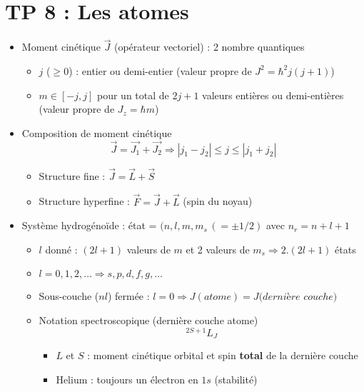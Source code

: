 
\section*{TP 8 : Les atomes}
\begin{itemize}
	\item Moment cinétique $\vec{J}$ (opérateur vectoriel) : 2 nombre quantiques
		\begin{itemize}
			\item $j$ ($\geq 0$) : entier ou demi-entier (valeur propre de $J^2 = \hbar ^2 j(j+1)$)
			\item $m \in [-j,j]$ pour un total de $2j +1$ valeurs entières ou demi-entières (valeur propre de $J_z = \hbar m$)
		\end{itemize}
		
	\item Composition de moment cinétique
	\begin{equation}
		\vec{J} = \vec{J_1}+\vec{J_2} \Rightarrow |j_1-j_2| \leq j \leq |j_1+j_2|
	\end{equation}
	\begin{itemize}
		\item Structure fine : $\vec{J}=\vec{L}+\vec{S}$
		\item Structure hyperfine : $\vec{F} = \vec{J}+\vec{L}$ (spin du noyau)
	\end{itemize}
	
	\item Système hydrogénoïde : état = $(n,l,m,m_s \, (= \pm 1/2)$ avec $n_r = n+l+1$
	\begin{itemize}
		\item $l$ donné : $(2l+1)$ valeurs de $m$ et 2 valeurs de $m_s \Rightarrow 2.(2l+1)$ états
		
		\item $l = 0,1,2, \dots \Rightarrow s,p,d,f,g,\dots$
		
		\item Sous-couche ($nl$) fermée : $l = 0 \Rightarrow J(atome) = J(dernière$ $couche)$
		
		\item Notation spectroscopique (dernière couche atome)
		\begin{equation}
			^{2S+1}L_J
		\end{equation}
		\begin{itemize}
			\item $L$ et $S$ : moment cinétique orbital et spin \textbf{total} de la dernière couche
			
			\item Helium : toujours un électron en $1s$ (stabilité)
		\end{itemize}
	\end{itemize}
\end{itemize}
